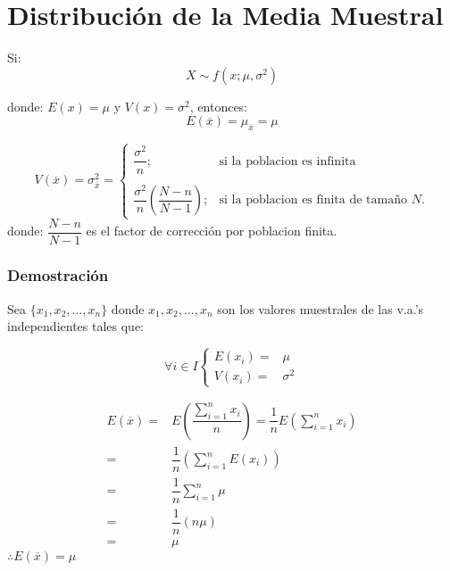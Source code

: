 \section{Distribución de la Media Muestral}
Si:
$$X \sim f(x;\mu,\sigma^2)$$

donde: $E(x) = \mu$ y $V(x) =\sigma^2$, entonces:
$$E(\overline{x}) = \mu_{\overline{x}} = \mu$$

$$
V(\overline{x}) = \sigma^2_{\overline{x}}= 
\begin{cases}
\dfrac{\sigma^2}{n} ;&\text{si la poblacion es infinita}\\
& \\
\dfrac{\sigma^2}{n}\left(\dfrac{N-n}{N-1}\right) ;& \text{si la poblacion es finita de tamaño $N$.}
\end{cases}
$$
donde: $\dfrac{N-n}{N-1}$ es el factor de corrección por poblacion finita.
\subsubsection{Demostración}
Sea $\{x_1,x_2,\ldots,x_n\}$ donde $x_1,x_2,\ldots,x_n$ son los valores muestrales de las v.a.'s independientes tales que:

$$ \forall i\in I
\begin{cases}
E(x_i) =&\mu \\
V(x_i) =&\sigma^2
\end{cases}
$$

\begin{align*}
E(\overline{x}) =& E\left(\dfrac{\displaystyle\sum_{i=1}^{n} x_i}{n}\right) = \dfrac{1}{n}E\left(  \displaystyle\sum_{i=1}^{n} x_i \right) \\
=& \dfrac{1}{n} \left(  \displaystyle\sum_{i=1}^{n} E(x_i) \right) \\ 
=& \dfrac{1}{n}\displaystyle\sum_{i=1}^{n} \mu \\
=& \dfrac{1}{n} (n\mu) \\
=& \mu
\end{align*}
$\therefore E(\overline{x}) = \mu$
